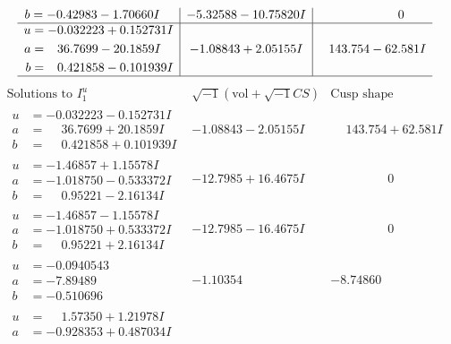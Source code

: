 \documentclass[1p]{elsarticle_modified}
\theoremstyle{definition}
\newcommand{\I}{\sqrt{-1}}
\begin{document}
$$\begin{array}{c|c|c}
\begin{aligned}
b &= -0.42983 - 1.70660 I\end{aligned}
 & -5.32588 - 10.75820 I & \phantom{-0.000000 } 0 \\ \hline\begin{aligned}
u &= -0.032223 + 0.152731 I \\
a &= \phantom{-}36.7699 - 20.1859 I \\
b &= \phantom{-}0.421858 - 0.101939 I\end{aligned}
 & -1.08843 + 2.05155 I & \phantom{-}143.754 - 62.581 I\\
 \hline 
 \end{array}$$\newpage$$\begin{array}{c|c|c}  
\text{Solutions to }I^u_{1}& \I (\text{vol} + \sqrt{-1}CS) & \text{Cusp shape}\\
 \hline 
\begin{aligned}
u &= -0.032223 - 0.152731 I \\
a &= \phantom{-}36.7699 + 20.1859 I \\
b &= \phantom{-}0.421858 + 0.101939 I\end{aligned}
 & -1.08843 - 2.05155 I & \phantom{-}143.754 + 62.581 I \\ \hline\begin{aligned}
u &= -1.46857 + 1.15578 I \\
a &= -1.018750 - 0.533372 I \\
b &= \phantom{-}0.95221 - 2.16134 I\end{aligned}
 & -12.7985 + 16.4675 I & \phantom{-0.000000 } 0 \\ \hline\begin{aligned}
u &= -1.46857 - 1.15578 I \\
a &= -1.018750 + 0.533372 I \\
b &= \phantom{-}0.95221 + 2.16134 I\end{aligned}
 & -12.7985 - 16.4675 I & \phantom{-0.000000 } 0 \\ \hline\begin{aligned}
u &= -0.0940543\phantom{ +0.000000I} \\
a &= -7.89489\phantom{ +0.000000I} \\
b &= -0.510696\phantom{ +0.000000I}\end{aligned}
 & -1.10354\phantom{ +0.000000I} & -8.74860\phantom{ +0.000000I} \\ \hline\begin{aligned}
u &= \phantom{-}1.57350 + 1.21978 I \\
a &= -0.928353 + 0.487034 I \\

\end{aligned}
\end{array}$$
\end{document}
